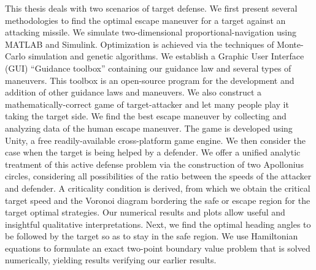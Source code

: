 This thesis deals with two scenarios of target defense. We first present several methodologies to find the optimal escape maneuver for a target against an attacking missile. We simulate two-dimensional proportional-navigation using MATLAB and Simulink. Optimization is achieved via the techniques of Monte-Carlo simulation and genetic algorithms. We establish a Graphic User Interface (GUI) “Guidance toolbox” containing our guidance law and several types of maneuvers. This toolbox is an open-source program for the development and addition of other guidance laws and maneuvers. We also construct a mathematically-correct game of target-attacker and let many people play it taking the target side. We find the best escape maneuver by collecting and analyzing data of the human escape maneuver. The game is developed using Unity, a free readily-available cross-platform game engine. We then consider the case when the target is being helped by a defender. We offer a unified analytic treatment of this active defense problem via the construction of two Apollonius circles, considering all possibilities of the ratio between the speeds of the attacker and defender. A criticality condition is derived, from which we obtain the critical target speed and the Voronoi diagram bordering the safe or escape region for the target optimal strategies. Our numerical results and plots allow useful and insightful qualitative interpretations. Next, we find the optimal heading angles to be followed by the target so as to stay in the safe region. We use Hamiltonian equations to formulate an exact two-point boundary value problem that is solved numerically, yielding results verifying our earlier results.  
